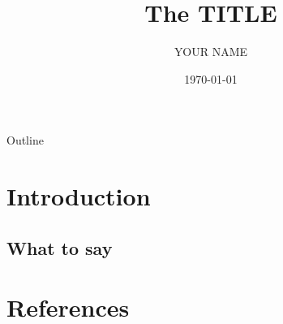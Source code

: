 \documentclass{beamer}
\title[abbr]{The TITLE}
\author{YOUR NAME}
\date{\today}
\begin{document}
\begin{frame}
  \titlepage
\end{frame}

\begin{frame}{Outline}
  \tableofcontents[hideallsubsections]
\end{frame}

\section{Introduction}
\subsection*{What to say}
\section{References}
\begin{frame}[allowframebreaks]
  
\end{frame}
\end{document}
